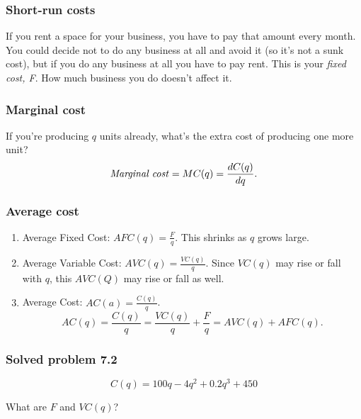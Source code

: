 \documentclass[xcolor=pdftex,dvipsnames]{beamer}
\begin{document}
\begin{frame}
\frametitle{Short-run costs}
If you rent a space for your business, you have to pay that amount
every month. You could decide not to do any business at all and avoid
it (so it's not a sunk cost), but if you do any business at all you
have to pay rent. This is your \emph{fixed cost, F}. How much business
you do doesn't affect it.
\bigskip

\bigskip


\end{frame}





\begin{frame}
\frametitle{Marginal cost}
If you're producing $q$ units already, what's the extra cost of
producing one more unit?
\[
\text{\emph{Marginal cost}}= MC(q) = \frac{dC(q)}{dq}.
\]


\end{frame}



\begin{frame}
\frametitle{Average cost}
\begin{enumerate}[<+->]
\item Average Fixed Cost: $AFC(q)=\frac{F}{q}$. This shrinks as $q$ grows
  large.
\item Average Variable Cost: $AVC(q) =\frac{VC(q)}{q}$. Since $VC(q)$ may
  rise or fall with $q$, this $AVC(Q)$ may rise or fall as well.
\item Average Cost: $AC(a)=\frac{C(q)}{q}$.
\[
AC(q) = \frac{C(q)}{q} = \frac{VC(q)}{q} + \frac{F}{q} = AVC(q)+AFC(q).
\]
\end{enumerate}
\end{frame}



\begin{frame}
\frametitle{Solved problem 7.2}
\[
C(q) = 100q - 4q^2 + 0.2q^3 + 450
\]

What are $F$ and $VC(q)$?

\end{frame}
\end{document}
